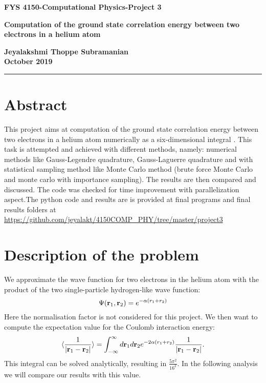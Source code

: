 \documentclass[9pt,a4paper,titlepage]{article}
\begin{document}
\begin{center}

{\LARGE \bfseries FYS 4150-Computational Physics-Project 3\par}
\vspace{0.5cm}
{\LARGE \bfseries Computation of the ground state correlation energy between two electrons in a helium atom \par}
\vspace{0.5cm}
{ \bfseries Jeyalakshmi Thoppe Subramanian }
\\
\vspace{0.5cm}
{\bfseries October 2019}
\end{center}
\begin{center}
\hrule height 2 pt
\end{center} 

\section{Abstract}
This project aims at computation of the ground state correlation energy between two electrons in a helium atom numerically as a six-dimensional integral . This task is attempted and achieved  with different methods, namely: numerical methods like Gauss-Legendre quadrature, Gauss-Laguerre quadrature and with statistical sampling method like  Monte Carlo method (brute force Monte Carlo  and monte carlo with importance sampling). The results are then compared and discussed. The code was checked for time improvement with parallelization aspect.The python code and results are is provided at  final programs and final results folders at 
\url{https://github.com/jeyalakt/4150COMP_PHY/tree/master/project3}
 
\section{Description of the problem}

We approximate the wave function for two electrons in the helium atom with the product of the two single-particle hydrogen-like wave function:
\begin{equation}
\Psi({\bf r}_1,{\bf r}_2) = e^{-\alpha (r_1+r_2)}
\end{equation}
Here the normalisation factor is not considered for this project. 
We then want to compute the expectation value for the Coulomb interaction energy:
\begin{equation}\label{eq:correlationenergy}
   \langle \frac{1}{|{\bf r}_1-{\bf r}_2|} \rangle =
   \int_{-\infty}^{\infty} d{\bf r}_1d{\bf r}_2  e^{-2\alpha (r_1+r_2)}\frac{1}{|{\bf r}_1-{\bf r}_2|}.
\end{equation}
This integral can be solved analytically, resulting in $\frac{5\pi^{2}}{16^{2}}$. In the following analysis we will compare our results with this value.
\end{document}
